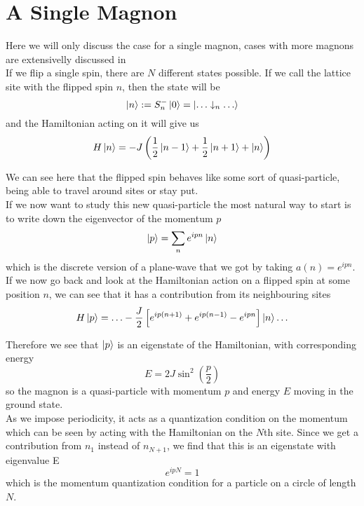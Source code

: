 \documentclass[../fstates.tex,../../main.tex]{subfiles}
\begin{document}
\section{A Single Magnon}
Here we will only discuss the case for a single magnon, cases with more magnons are extensivelly discussed in \cite{fazekas, deleeuw,plantz}\\

If we flip a single spin, there are $N$ different states possible. If we call the lattice site with the flipped spin $n$, then the state will be
\begin{equation}
    \ket{n}:=S^{-}_{n}\ket{0}=\ket{\ldots\downarrow_{n}\ldots}
\end{equation}
and the Hamiltonian acting on it will give us
\begin{equation}
    H\ket{n}=-J\left(\frac{1}{2}\ket{n-1}+\frac{1}{2}\ket{n+1}+\ket{n}\right)
\end{equation}

We can see here that the flipped spin behaves like some sort of quasi-particle, being able to travel around sites or stay put.\\

If we now want to study this new quasi-particle the most natural way to start is to write down the eigenvector of the momentum $p$
\begin{equation}
    \ket{p}=\sum_{n}e^{ipn}\ket{n}
\end{equation}
which is the discrete version of a plane-wave that we got by taking $a(n)=e^{ipn}$.\\

If we now go back and look at the Hamiltonian action on a flipped spin at some position $n$, we can see that it has a contribution from its neighbouring sites
\begin{equation}
    H\ket{p}=\ldots-\frac{J}{2}\left[e^{ip(n+1)}+e^{ip(n-1)}-e^{ipn}\right]\ket{n}\ldots
\end{equation}

Therefore we see that $\ket{p}$ is an eigenstate of the Hamiltonian, with corresponding energy
\begin{equation}
    E=2J\sin^{2}\left(\frac{p}{2}\right)
\end{equation}
so the magnon is a quasi-particle with momentum $p$ and energy $E$ moving in the ground state.\\

As we impose periodicity, it acts as a quantization condition on the momentum which can be seen by acting with the Hamiltonian on the $N$th site. Since we get a contribution from $n_{1}$ instead of $n_{N+1}$, we find that this is an eigenstate with eigenvalue E
\begin{equation}
    e^{ipN}=1
\end{equation}
which is the momentum quantization condition for a particle on a circle of length $N$. 
\end{document}
